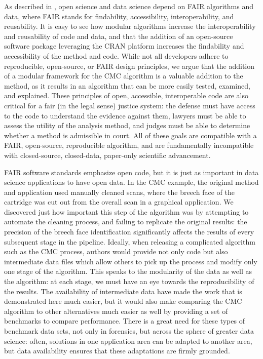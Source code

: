 As described in \citet{wittenburg_open_2021}, open science and data
science depend on FAIR algorithms and data, where FAIR stands for
findability, accessibility, interoperability, and reusability. It is
easy to see how modular algorithms increase the interoperability and
reusability of code and data, and that the addition of an open-source
software package leveraging the CRAN platform increases the findability
and accessibility of the method and code. While not all developers
adhere to reproducible, open-source, or FAIR design principles, we argue
that the addition of a modular framework for the CMC algorithm is a
valuable addition to the method, as it results in an algorithm that can
be more easily tested, examined, and explained. These principles of
open, accessible, interoperable code are also critical for a fair (in
the legal sense) justice system: the defense must have access to the
code to understand the evidence against them, lawyers must be able to
assess the utility of the analysis method, and judges must be able to
determine whether a method is admissible in court. All of these goals
are compatible with a FAIR, open-source, reproducible algorithm, and are
fundamentally incompatible with closed-source, closed-data, paper-only
scientific advancement.

FAIR software standards emphasize open code, but it is just as important
in data science applications to have open data. In the CMC example, the
original method and application used manually cleaned scans, where the
breech face of the cartridge was cut out from the overall scan in a
graphical application. We discovered just how important this step of the
algorithm was by attempting to automate the cleaning process, and
failing to replicate the original results: the precision of the breech
face identification significantly affects the results of every
subsequent stage in the pipeline. Ideally, when releasing a complicated
algorithm such as the CMC process, authors would provide not only code
but also intermediate data files which allow others to pick up the
process and modify only one stage of the algorithm. This speaks to the
modularity of the data as well as the algorithm: at each stage, we must
have an eye towards the reproducibility of the results. The availability
of intermediate data have made the work that is demonstrated here much
easier, but it would also make comparing the CMC algorithm to other
alternatives much easier as well by providing a set of benchmarks to
compare performance. There is a great need for these types of benchmark
data sets, not only in forensics, but across the sphere of greater data
science: often, solutions in one application area can be adapted to
another area, but data availability ensures that these adaptations are
firmly grounded.


